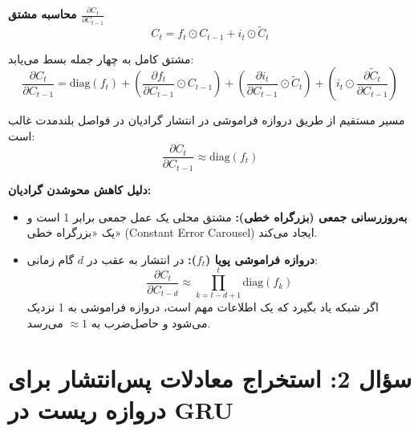 \documentclass[12pt,a4paper]{article}
\begin{document}
	\begin{tcolorbox}[colback=softorange,colframe=golden,title=\textbf{تحلیل و محاسبات}]
		\textbf{محاسبه مشتق $\frac{\partial C_t}{\partial C_{t-1}}$}
		\begin{equation}
			C_t = f_t \odot C_{t-1} + i_t \odot \tilde{C}_t
		\end{equation}
		
		مشتق کامل به چهار جمله بسط می‌یابد:
		\begin{equation}
			\frac{\partial C_t}{\partial C_{t-1}} = \text{diag}(f_t) + \left( \frac{\partial f_t}{\partial C_{t-1}} \odot C_{t-1} \right) + \left( \frac{\partial i_t}{\partial C_{t-1}} \odot \tilde{C}_t \right) + \left( i_t \odot \frac{\partial \tilde{C}_t}{\partial C_{t-1}} \right)
		\end{equation}
		
		مسیر مستقیم از طریق دروازه فراموشی در انتشار گرادیان در فواصل بلندمدت غالب است:
		\begin{equation}
			\frac{\partial C_t}{\partial C_{t-1}} \approx \text{diag}(f_t)
		\end{equation}
		
		\textbf{دلیل کاهش محوشدن گرادیان:}
		\begin{itemize}
			\item \textbf{به‌روزرسانی جمعی (بزرگراه خطی):} مشتق محلی یک عمل جمعی برابر 1 است و یک «بزرگراه خطی» (Constant Error Carousel) ایجاد می‌کند.
			\item \textbf{دروازه فراموشی پویا ($f_t$):} در انتشار به عقب در $d$ گام زمانی:
			\begin{equation}
				\frac{\partial C_t}{\partial C_{t-d}} \approx \prod_{k=t-d+1}^{t} \text{diag}(f_k)
			\end{equation}
			اگر شبکه یاد بگیرد که یک اطلاعات مهم است، دروازه فراموشی به 1 نزدیک می‌شود و حاصل‌ضرب به $\approx 1$ می‌رسد.
		\end{itemize}
	\end{tcolorbox}
	
	
	\section{سؤال 2: استخراج معادلات پس‌انتشار برای دروازه ریست در GRU}
	
\end{document}
